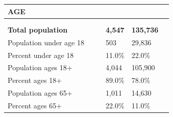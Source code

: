 \documentclass[9pt]{report}
\begin{document}
\vspace{24pt}
\setlength{\tabcolsep}{.01in} %
\begin{tabular}{p{.10in}p{.10in}p{.10in}p{3.7in}>{\hfill}p{.85in}>{\hfill}p{.85in}>{\hfill}p{.85in}>{\hfill}p{.85in}p{0.1in}}
\multicolumn{9}{l}{\parbox{7.1in}{\raggedright{\large{\strut\textbf{AGE}\strut}}}} \\ 
\hline
\multicolumn{4}{l}{\parbox{3.5in}{\raggedright{\textbf{}}}} & \multicolumn{1}{r}{\parbox{.85in}{\strut\raggedleft{\textbf{}\strut}}} & \multicolumn{1}{r}{\parbox{.85in}{\strut\raggedleft{\textbf{}\strut}}} & \multicolumn{1}{r}{\parbox{.85in}{\strut{}}} & \multicolumn{1}{r}{\parbox{.85in}{\strut{}}} & \\ 
\multicolumn{9}{l}{} \\ 
\multicolumn{4}{l}{\parbox{3.5in}{\strut\raggedright{\textbf{Total population}\strut}}} & \textbf{} & \textbf{} & \textbf{4,547} & \textbf{135,736} & \textbf{} \\ 
\multicolumn{4}{l}{\parbox{3.6in}{\strut\raggedright{{Population under age 18}}\strut}} &  &  & 503 & 29,836 & \multicolumn{1}{l}{}  \\ 
\multicolumn{4}{l}{\parbox{3.6in}{\strut\raggedright{{Percent under age 18}}\strut}} &  &  & 11.0\% & 22.0\% & \multicolumn{1}{l}{}  \\ 
\multicolumn{4}{l}{\parbox{3.6in}{\strut\raggedright{{Population ages 18+}}\strut}} &  &  & 4,044 & 105,900 & \multicolumn{1}{l}{}  \\ 
\multicolumn{4}{l}{\parbox{3.6in}{\strut\raggedright{{Percent ages 18+}}\strut}} &  &  & 89.0\% & 78.0\% & \multicolumn{1}{l}{}  \\ 
\multicolumn{4}{l}{\parbox{3.6in}{\strut\raggedright{{Population ages 65+}}\strut}} &  &  & 1,011 & 14,630 & \multicolumn{1}{l}{}  \\ 
\multicolumn{4}{l}{\parbox{3.6in}{\strut\raggedright{{Percent ages 65+}}\strut}} &  &  & 22.0\% & 11.0\% & \multicolumn{1}{l}{}  \\ 

\end{tabular}
\setlength{\tabcolsep}{6pt} %
\end{document}
